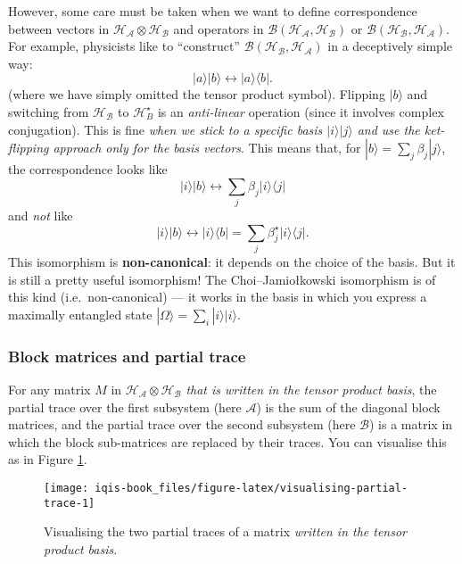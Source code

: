 \documentclass[fleqn]{article}
\begin{document}
However, some care must be taken when we want to define correspondence between vectors in \(\mathcal{H}_{\mathcal{A}}\otimes\mathcal{H}_{\mathcal{B}}\) and operators in \(\mathscr{B}(\mathcal{H}_{\mathcal{A}},\mathcal{H}_{\mathcal{B}})\) or \(\mathscr{B}(\mathcal{H}_{\mathcal{B}},\mathcal{H}_{\mathcal{A}})\).
For example, physicists like to ``construct'' \(\mathscr{B}(\mathcal{H}_{\mathcal{B}},\mathcal{H}_{\mathcal{A}})\) in a deceptively simple way:
\[
  |a\rangle|b\rangle \longleftrightarrow |a\rangle\langle b|.
\]
(where we have simply omitted the tensor product symbol).
Flipping \(|b\rangle\) and switching from \(\mathcal{H}_{\mathcal{B}}\) to \(\mathcal{H}^\star_B\) is an \emph{anti-linear} operation (since it involves complex conjugation).
This is fine \emph{when we stick to a specific basis \(|i\rangle|j\rangle\) and use the ket-flipping approach only for the basis vectors}.
This means that, for \(|b\rangle=\sum_j\beta_j|j\rangle\), the correspondence looks like
\[
  |i\rangle|b\rangle \longleftrightarrow \sum_j \beta_j |i\rangle\langle j|
\]
and \emph{not} like
\[
  |i\rangle|b\rangle \longleftrightarrow |i\rangle\langle b|
  = \sum_j \beta^\star_j |i\rangle\langle j|.
\]
This isomorphism is \textbf{non-canonical}: it depends on the choice of the basis.
But it is still a pretty useful isomorphism!
The Choi--Jamiołkowski isomorphism is of this kind (i.e.~non-canonical) --- it works in the basis in which you express a maximally entangled state \(|\Omega\rangle=\sum_i|i\rangle|i\rangle\).

\hypertarget{block-matrices-and-partial-trace}{%
\subsubsection{Block matrices and partial trace}\label{block-matrices-and-partial-trace}}

For any matrix \(M\) in \(\mathcal{H}_{\mathcal{A}}\otimes\mathcal{H}_{\mathcal{B}}\) \emph{that is written in the tensor product basis}, the partial trace over the first subsystem (here \(\mathcal{A}\)) is the sum of the diagonal block matrices, and the partial trace over the second subsystem (here \(\mathcal{B}\)) is a matrix in which the block sub-matrices are replaced by their traces.
You can visualise this as in Figure \ref{fig:visualising-partial-trace}.



\begin{figure}[H]

{\centering \texttt{[image: iqis-book\_files/figure-latex/visualising-partial-trace-1]} 

}

\caption{Visualising the two partial traces of a matrix \emph{written in the tensor product basis}.}\label{fig:visualising-partial-trace}
\end{figure}
\end{document}
